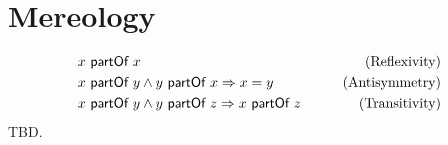 \section{Mereology}
\begin{align}
&x ~\textsf{partOf}~ x 
&\qquad \text{(Reflexivity)}
\\&x ~\textsf{partOf}~ y \wedge y ~\textsf{partOf}~ x \Rightarrow x = y
&\qquad \text{(Antisymmetry)}
\\&x ~\textsf{partOf}~ y \wedge y ~\textsf{partOf}~ z \Rightarrow x ~\textsf{partOf}~ z
&\qquad \text{(Transitivity)}
\end{align}
TBD.